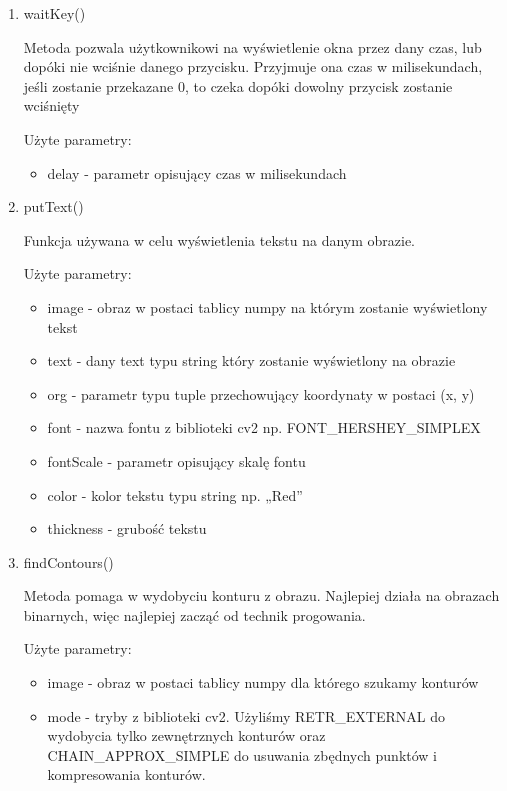 \documentclass{article}
\begin{document}
\begin{enumerate}
\item waitKey() \cite{opencv6}

Metoda pozwala użytkownikowi na wyświetlenie okna przez dany czas, lub dopóki nie wciśnie danego przycisku. Przyjmuje ona czas w milisekundach, jeśli zostanie przekazane 0, to czeka dopóki dowolny przycisk zostanie wciśnięty

Użyte parametry:
\begin{itemize}
\item delay - parametr opisujący czas w milisekundach
\end{itemize}

\item putText() \cite{opencv7}

Funkcja używana w celu wyświetlenia tekstu na danym obrazie.

Użyte parametry:

\begin{itemize}
\item image - obraz w postaci tablicy numpy na którym zostanie wyświetlony tekst
\item text - dany text typu string który zostanie wyświetlony na obrazie
\item org - parametr typu tuple przechowujący koordynaty w postaci (x, y)
\item font - nazwa fontu z biblioteki cv2 np. FONT\_HERSHEY\_SIMPLEX
\item fontScale - parametr opisujący skalę fontu
\item color - kolor tekstu typu string np. „Red”
\item thickness - grubość tekstu
\end{itemize}

\item findContours() \cite{opencv8}

Metoda pomaga w wydobyciu konturu z obrazu. Najlepiej działa na obrazach binarnych, więc najlepiej zacząć od technik progowania.

Użyte parametry:

\begin{itemize}
\item image - obraz w postaci tablicy numpy dla którego szukamy konturów
\item mode - tryby z biblioteki cv2. Użyliśmy RETR\_EXTERNAL  do wydobycia tylko zewnętrznych konturów oraz CHAIN\_APPROX\_SIMPLE do usuwania zbędnych punktów i kompresowania konturów.
\end{itemize}


\end{enumerate}
\end{document}
